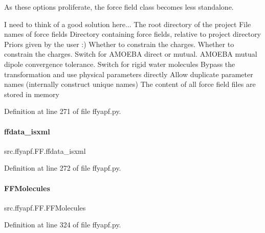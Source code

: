 As these options proliferate, the force field class becomes less standalone. 

I need to think of a good solution here... The root directory of the project File names of force fields Directory containing force fields, relative to project directory Priors given by the user \+:) Whether to constrain the charges. Whether to constrain the charges. Switch for A\+M\+O\+E\+BA direct or mutual. A\+M\+O\+E\+BA mutual dipole convergence tolerance. Switch for rigid water molecules Bypass the transformation and use physical parameters directly Allow duplicate parameter names (internally construct unique names) The content of all force field files are stored in memory 

Definition at line 271 of file ffyapf.\+py.

\mbox{\label{classsrc_1_1ffyapf_1_1FF_afdfcd362bdd2bee8c34193f0dda5aa3b}} 
\paragraph{\texorpdfstring{ffdata\+\_\+isxml}{ffdata\_isxml}}
{\footnotesize\ttfamily src.\+ffyapf.\+F\+F.\+ffdata\+\_\+isxml}



Definition at line 272 of file ffyapf.\+py.

\mbox{\label{classsrc_1_1ffyapf_1_1FF_afee4ac5d39a026fc88efa63d3e82b105}} 
\paragraph{\texorpdfstring{F\+F\+Molecules}{FFMolecules}}
{\footnotesize\ttfamily src.\+ffyapf.\+F\+F.\+F\+F\+Molecules}



Definition at line 324 of file ffyapf.\+py.

\mbox{\label{classsrc_1_1ffyapf_1_1FF_a7bf885d5ba1489b97bb4b90dc689f252}} 
